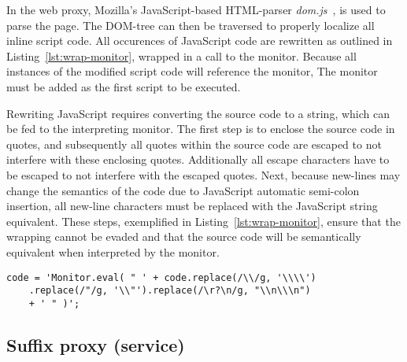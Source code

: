 \documentclass{llncs}
\begin{document}
In the web proxy, Mozilla's JavaScript-based HTML-parser \emph{dom.js}~\cite{Mozilla:dom.js}, is used 
to parse the page. The DOM-tree can then be traversed to properly localize 
all inline script code. All occurences of JavaScript code are rewritten as 
outlined in Listing~\ref{lst:wrap-monitor}, wrapped in a call to the monitor.
Because all instances of the modified script code will reference the monitor, 
The monitor must be added as the first script to be executed.


Rewriting JavaScript requires converting the source code to a string, which can 
be fed to the interpreting monitor. The first step is to enclose the source code 
in quotes, and subsequently all quotes within the source code are escaped to 
not interfere with these enclosing quotes.
Additionally all escape characters have to be escaped to not interfere with the escaped 
quotes. Next, because new-lines may change the semantics of the code due to 
JavaScript automatic semi-colon insertion, all new-line 
characters must be replaced with the JavaScript string equivalent.
These steps, exemplified in Listing~\ref{lst:wrap-monitor}, ensure that the 
wrapping cannot be evaded and that the source code 
will be semantically equivalent when interpreted by the monitor.

\begin{lstlisting}[label=lst:wrap-monitor, caption=Example of monitor wrapping]
code = 'Monitor.eval( " ' + code.replace(/\\/g, '\\\\')
	.replace(/"/g, '\\"').replace(/\r?\n/g, "\\n\\\n")
	+ ' " )';
\end{lstlisting}




\subsection{Suffix proxy (service)}

\end{document}
